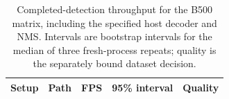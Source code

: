 \begin{table}[htbp]
\centering\small\TableSetup
\caption{Completed-detection throughput for the B500 matrix, including the specified host decoder and NMS. Intervals are bootstrap intervals for the median of three fresh-process repeats; quality is the separately bound dataset decision.}
\label{tab:evaluation:yolov7_standard_native}
\begin{tabularx}{\linewidth}{@{}L{1.55cm}Y S[table-format=2.2]r l@{}}
\toprule
\textbf{Setup} & \textbf{Path} & {\textbf{FPS}} & \textbf{95\% interval} & \textbf{Quality} \\
\midrule
\bottomrule
\end{tabularx}
\end{table}
